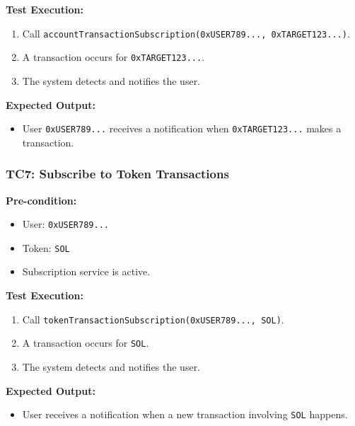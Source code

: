 \documentclass[
]{article}
\providecommand{\tightlist}{%
  \setlength{\itemsep}{0pt}\setlength{\parskip}{0pt}}
\begin{document}
\textbf{Test Execution:}

\begin{enumerate}
\def\labelenumi{\arabic{enumi}.}
\tightlist
\item
  Call
  \texttt{accountTransactionSubscription(0xUSER789...,\ 0xTARGET123...)}.
\item
  A transaction occurs for \texttt{0xTARGET123...}.
\item
  The system detects and notifies the user.
\end{enumerate}

\textbf{Expected Output:}

\begin{itemize}
\tightlist
\item
  User \texttt{0xUSER789...} receives a notification when
  \texttt{0xTARGET123...} makes a transaction.
\end{itemize}

\hypertarget{tc7-subscribe-to-token-transactions}{%
\subsubsection{\texorpdfstring{\textbf{TC7: Subscribe to Token
Transactions}}{TC7: Subscribe to Token Transactions}}\label{tc7-subscribe-to-token-transactions}}

\textbf{Pre-condition:}

\begin{itemize}
\tightlist
\item
  User: \texttt{0xUSER789...}
\item
  Token: \texttt{SOL}
\item
  Subscription service is active.
\end{itemize}

\textbf{Test Execution:}

\begin{enumerate}
\def\labelenumi{\arabic{enumi}.}
\tightlist
\item
  Call \texttt{tokenTransactionSubscription(0xUSER789...,\ SOL)}.
\item
  A transaction occurs for \texttt{SOL}.
\item
  The system detects and notifies the user.
\end{enumerate}

\textbf{Expected Output:}

\begin{itemize}
\tightlist
\item
  User receives a notification when a new transaction involving
  \texttt{SOL} happens.
\end{itemize}
\end{document}
